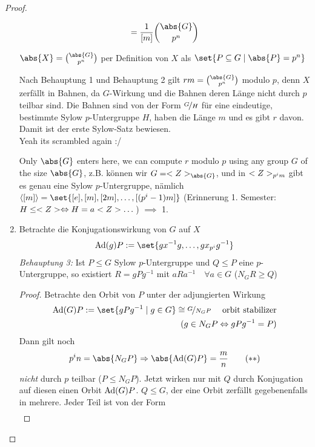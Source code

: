 \begin{proof}
\begin{enumerate}
		\begin{align*}
		[r] = \frac{1}{[m]}\binom{\abs{G}}{p^n}
		\end{align*}
		\begin{*remark}
			$\abs{X} = \binom{\abs{G}}{p^n}$ per Definition von $X$ als $\set{P \subseteq G \mid \abs{P} = p^n}$
		\end{*remark}
		Nach Behauptung 1 und Behauptung 2 gilt $rm = \binom{\abs{G}}{p^n}$ modulo $p$, denn $X$ zerfällt in Bahnen, da $G$-Wirkung und die Bahnen deren Länge nicht durch $p$ teilbar sind. Die Bahnen sind von der Form $\lnkset{G}{H}$ für eine eindeutige, bestimmte Sylow $p$-Untergruppe $H$, haben die Länge $m$ und es gibt $r$ davon. Damit ist der erste Sylow-Satz bewiesen. \\
		Yeah its scrambled again :/
		\begin{*remark}
			Only $\abs{G}$ enters here, we can compute $r$ modulo $p$ using any group $G$ of the size $\abs{G}$, z.B. können wir $G = \Z_{\abs{G}}$, und in $<Z>_{p^{i} m}$ gibt es genau eine Sylow $p$-Untergruppe, nämlich $\langle [m]\rangle = \set{[e], [m], [2m], \dots, [(p^{i} - 1)m]}$ (Erinnerung 1. Semester: $H \le <Z> \Leftrightarrow H = a<Z> \dots $) $\implies$ 1.
		\end{*remark}
	\item Betrachte die Konjugationswirkung von $G$ auf $X$
	\begin{align*}
		\Ad(g)P := \set{gx^{-1}g, \dots, gx_{p^{i}}g^{-1}}
	\end{align*}
	\emph{Behauptung 3:} Ist $P \le G$ Sylow $p$-Untergruppe und $Q \le P$ eine $p$-Untergruppe, so existiert $R = gPg^{-1}$ mit $aRa^{-1}\quad \forall a \in G$ ($N_G R \ge Q$)
	\begin{proof}
		Betrachte den Orbit von $P$ unter der adjungierten Wirkung
		\begin{align*}
			\Ad(G)P := \set{gPg^{-1} \mid g \in G} \cong \lnkset{G}{N_G P} \quad \text{ orbit stabilizer}\\
			(g \in N_G P \Leftrightarrow gPg^{-1} = P)
		\end{align*}
		Dann gilt noch 
		\begin{align*}
			p^i n = \abs{N_G P} \implies \abs{\Ad(G)P} = \frac{m}{n}\tag{$\ast \ast$}\label{eq_sylow_proof_2}
		\end{align*}
		\emph{nicht} durch $p$ teilbar ($P \le N_G P$). Jetzt wirken nur mit $Q$ durch Konjugation auf diesen einen Orbit $\operatorname{Ad}(G)P$. $Q \le G$, der eine Orbit zerfällt gegebenenfalls in mehrere. Jeder Teil ist von der Form
		\begin{align*}

\end{align*}
\end{proof}
\end{enumerate}
\end{proof}
